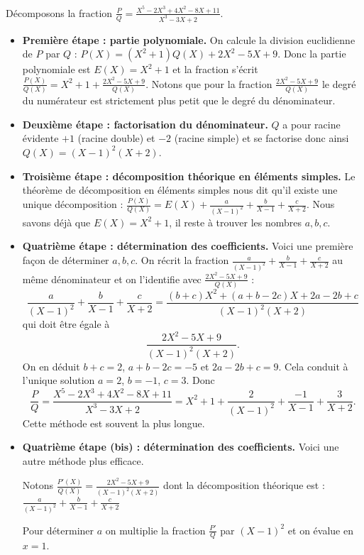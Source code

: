 \documentclass[class=report,crop=false]{standalone}
\begin{document}
\begin{exemple}
Décomposons la fraction $\displaystyle\frac{P}{Q}= \frac{X^5-2X^3+4X^2-8X+11}{X^3-3X+2}$.

\begin{itemize}
  \item \textbf{Première étape : partie polynomiale.}
On calcule la division euclidienne de $P$ par $Q$ :
$P(X) = (X^2+1)Q(X)+ 2X^2-5X+9$.
Donc la partie polynomiale est $E(X)=X^2+1$ et la fraction s'écrit
$\frac{P(X)}{Q(X)} =X^2+1 + \frac{2X^2-5X+9}{Q(X)}$.
Notons que pour la fraction $\frac{2X^2-5X+9}{Q(X)}$ le degré du numérateur
est strictement plus petit que le degré du dénominateur.

  \item \textbf{Deuxième étape : factorisation du dénominateur.}
$Q$ a pour racine évidente $+1$ (racine double) et $-2$ (racine simple) et se factorise donc ainsi
$Q(X)= (X-1)^2(X+2)$.

  \item \textbf{Troisième étape : décomposition théorique en éléments simples.}
Le théorème de décomposition en éléments simples nous dit qu'il existe une unique décomposition :
$\frac{P(X)}{Q(X)}= E(X)+ \frac{a}{(X-1)^2} + \frac{b}{X-1} + \frac{c}{X+2}$.
Nous savons déjà que $E(X)=X^2+1$, il reste à trouver les nombres $a,b,c$.

  \item \textbf{Quatrième étape : détermination des coefficients.}
Voici une première façon de déterminer $a,b,c$.
On récrit la fraction $\frac{a}{(X-1)^2} + \frac{b}{X-1} + \frac{c}{X+2}$
au même dénominateur et on l'identifie avec $\frac{2X^2-5X+9}{Q(X)}$ :
$$\frac{a}{(X-1)^2} + \frac{b}{X-1} + \frac{c}{X+2} =
\frac{(b+c)X^2+(a+b-2c)X+2a-2b+c}{(X-1)^2(X+2)}$$
qui doit être égale à
$$\frac{2X^2-5X+9}{(X-1)^2(X+2)}.$$
On en déduit $b+c=2$, $a+b-2c=-5$ et $2a-2b+c=9$.
Cela conduit à l'unique solution $a=2$, $b=-1$, $c=3$.
Donc
$$\frac{P}{Q} = \frac{X^5-2X^3+4X^2-8X+11}{X^3-3X+2} = X^2+1 + \frac{2}{(X-1)^2} + \frac{-1}{X-1} + \frac{3}{X+2}.$$
Cette méthode est souvent la plus longue.

  \item \textbf{Quatrième étape (bis) : détermination des coefficients.}
Voici une autre méthode plus efficace.

Notons $\frac{P'(X)}{Q(X)} =  \frac{2X^2-5X+9}{(X-1)^2(X+2)}$ dont la décomposition théorique est :
$\frac{a}{(X-1)^2} + \frac{b}{X-1} + \frac{c}{X+2}$

Pour déterminer $a$ on multiplie la fraction $\frac{P'}{Q}$ par $(X-1)^2$ et on évalue en $x=1$.


\end{itemize}
\end{exemple}
\end{document}

